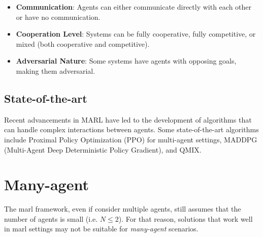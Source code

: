 \begin{itemize}
    \item \textbf{Communication}: Agents can either communicate directly with each other or have no communication.
    \item \textbf{Cooperation Level}: Systems can be fully cooperative, fully competitive, or mixed (both cooperative and competitive).
    \item \textbf{Adversarial Nature}: Some systems have agents with opposing goals, making them adversarial.
\end{itemize}

\subsection{State-of-the-art}
Recent advancements in MARL have led to the development of algorithms that can handle complex interactions between agents. Some state-of-the-art algorithms include Proximal Policy Optimization (PPO) for multi-agent settings, MADDPG (Multi-Agent Deep Deterministic Policy Gradient), and QMIX.

\section{Many-agent}
The \ac{marl} framework, even if consider multiple agents,
  still assumes that the number of agents is small (i.e. $N \leq 2$).
  For that reason, solutions that work well in \ac{marl} settings may not be suitable for \emph{many-agent} scenarios.

